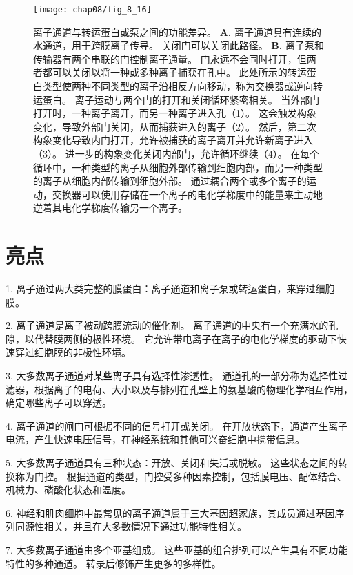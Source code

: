 \begin{figure}[htbp]
	\centering
	\texttt{[image: chap08/fig\_8\_16]}
	\caption{离子通道与转运蛋白或泵之间的功能差异\cite{gadsby2004spot}。 
		\textbf{A.} 离子通道具有连续的水通道，用于跨膜离子传导。
		关闭门可以关闭此路径。
		\textbf{B.} 离子泵和传输器有两个串联的门控制离子通量。
		门永远不会同时打开，但两者都可以关闭以将一种或多种离子捕获在孔中。
		此处所示的转运蛋白类型使两种不同类型的离子沿相反方向移动，称为交换器或逆向转运蛋白。
		离子运动与两个门的打开和关闭循环紧密相关。
		当外部门打开时，一种离子离开，而另一种离子进入孔（1）。
		这会触发构象变化，导致外部门关闭，从而捕获进入的离子（2）。
		然后，第二次构象变化导致内门打开，允许被捕获的离子离开并允许新离子进入（3）。
		进一步的构象变化关闭内部门，允许循环继续（4）。
		在每个循环中，一种类型的离子从细胞外部传输到细胞内部，而另一种类型的离子从细胞内部传输到细胞外部。
		通过耦合两个或多个离子的运动，交换器可以使用存储在一个离子的电化学梯度中的能量来主动地逆着其电化学梯度传输另一个离子。}
	\label{fig:8_16}
\end{figure}



\section{亮点}


1. 离子通过两大类完整的膜蛋白：离子通道和离子泵或转运蛋白，来穿过细胞膜。


2. 离子通道是离子被动跨膜流动的催化剂。
 离子通道的中央有一个充满水的孔隙，以代替膜两侧的极性环境。
它允许带电离子在离子的电化学梯度的驱动下快速穿过细胞膜的非极性环境。


3. 大多数离子通道对某些离子具有选择性渗透性。
通道孔的一部分称为选择性过滤器，根据离子的电荷、大小以及与排列在孔壁上的氨基酸的物理化学相互作用，确定哪些离子可以穿透。


4. 离子通道的闸门可根据不同的信号打开或关闭。
在开放状态下，通道产生离子电流，产生快速电压信号，在神经系统和其他可兴奋细胞中携带信息。


5. 大多数离子通道具有三种状态：开放、关闭和失活或脱敏。
这些状态之间的转换称为门控。
根据通道的类型，门控受多种因素控制，包括膜电压、配体结合、机械力、磷酸化状态和温度。


6. 神经和肌肉细胞中最常见的离子通道属于三大基因超家族，其成员通过基因序列同源性相关，并且在大多数情况下通过功能特性相关。


7. 大多数离子通道由多个亚基组成。
这些亚基的组合排列可以产生具有不同功能特性的多种通道。 转录后修饰产生更多的多样性。


